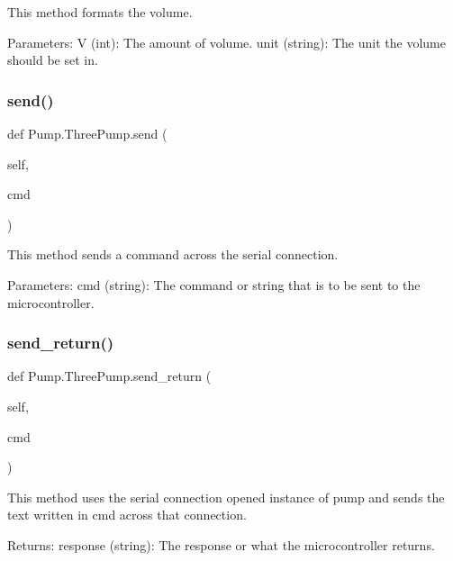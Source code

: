 \begin{DoxyVerb}This method formats the volume.

Parameters:
    V (int): The amount of volume.
    unit (string): The unit the volume should be set in.
\end{DoxyVerb}
 \mbox{\label{class_pump_1_1_three_pump_a71d2d68a580ddfb4b4ce7a0fc71f3919}} 
\subsubsection{\texorpdfstring{send()}{send()}}
{\footnotesize\ttfamily def Pump.\+Three\+Pump.\+send (\begin{DoxyParamCaption}\item[{}]{self,  }\item[{}]{cmd }\end{DoxyParamCaption})}

\begin{DoxyVerb}This method sends a command across the serial connection.

Parameters:
    cmd (string): The command or string that is to be sent to the microcontroller.
\end{DoxyVerb}
 \mbox{\label{class_pump_1_1_three_pump_a89b0e97caf73b7703e377bf4e3800e3b}} 
\subsubsection{\texorpdfstring{send\_return()}{send\_return()}}
{\footnotesize\ttfamily def Pump.\+Three\+Pump.\+send\+\_\+return (\begin{DoxyParamCaption}\item[{}]{self,  }\item[{}]{cmd }\end{DoxyParamCaption})}

\begin{DoxyVerb}This method uses the serial connection opened instance of pump and sends the text written in cmd across that connection.

Returns:
    response (string): The response or what the microcontroller returns.
\end{DoxyVerb}
 \mbox{\label{class_pump_1_1_three_pump_ab36f024171fea433ea2815b9fdbfcbed}} 
